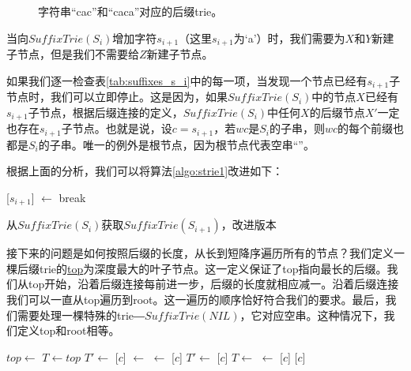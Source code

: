 \documentclass[UTF8]{article}
\begin{document}
\begin{figure}[htbp]
  \centering
  \caption{字符串“cac”和“caca”对应的后缀trie。}
  \label{fig:strie-cac}
\end{figure}

当向$SuffixTrie(S_i)$增加字符$s_{i+1}$（这里$s_{i+1}$为‘a’）时，我们需要为$X$和$Y$新建子节点，但是我们不需要给$Z$新建子节点。

如果我们逐一检查表\ref{tab:suffixes_s_i}中的每一项，当发现一个节点已经有$s_{i+1}$子节点时，我们可以立即停止。这是因为，如果$SuffixTrie(S_i)$中的节点$X$已经有$s_{i+1}$子节点，根据后缀连接的定义，$SuffixTrie(S_i)$中任何$X$的后缀节点$X'$一定也存在$s_{i+1}$子节点。也就是说，设$c=s_{i+1}$，若$wc$是$S_i$的子串，则$wc$的每个前缀也都是$S_i$的子串\cite{ukkonen95}。唯一的例外是根节点，因为根节点代表空串“”。

根据上面的分析，我们可以将算法\ref{algo:strie1}改进如下：

\begin{algorithm}
  \begin{algorithmic}[1]
      \State {}[$s_{i+1}$] $\gets$ 
    \Else
      \State break
    \EndIf
  \EndFor
  \end{algorithmic}
  \caption{从$SuffixTrie(S_i)$获取$SuffixTrie(S_{i+1})$，改进版本}
  \label{algo:strie2}
\end{algorithm}

接下来的问题是如何按照后缀的长度，从长到短降序遍历所有的节点？我们定义一棵后缀trie的\underline{top}为深度最大的叶子节点。这一定义保证了top指向最长的后缀。我们从top开始，沿着后缀连接每前进一步，后缀的长度就相应减一。沿着后缀连接我们可以一直从top遍历到root。这一遍历的顺序恰好符合我们的要求。最后，我们需要处理一棵特殊的trie―$SuffixTrie(NIL)$，它对应空串。这种情况下，我们定义top和root相等。

\begin{algorithmic}
   
    \State $top \gets$ 
  \EndIf
  \State $T \gets top$
  \State $T' \gets$  
    \State {}[$c$] $\gets$ 
    \State {} $\gets$ [$c$]
    \State $T' \gets$ [$c$]
    \State $T \gets$ 
  \EndWhile
    \State {} $\gets$ [$c$]
  \EndIf
  \State \Return {}[$c$] 
\EndFunction
\end{algorithmic}
\end{document}
